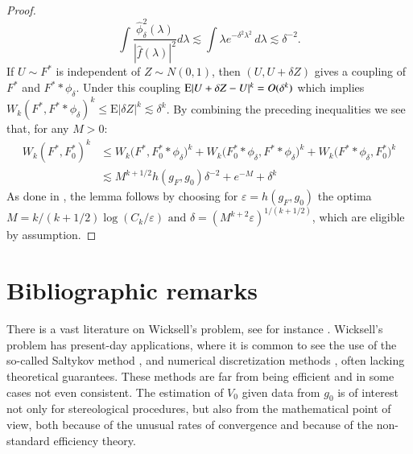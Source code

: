 \begin{proof}
    $$\int \frac{\hat{\phi}_{\delta}^2 (\lambda)} { |\hat{f} (\lambda)|^2}  d \lambda \lesssim \int \lambda e^{- \delta^2 \lambda^2} \, d\lambda \lesssim \delta^{-2}.$$
    If $U \sim F^*$ is independent of $Z \sim N(0,1)$, then $(U, U+\delta Z)$ gives a coupling of $F^*$ and $F^* * \phi_\delta$. Under this coupling $\mathrm{E} |U + \delta Z - U|^k  = O(\delta^k)$ which implies $W_k\left(F^*, F^* * \phi_\delta\right)^k \leq \mathrm{E}|\delta Z|^k \lesssim \delta^k$. By combining the preceding inequalities we see that, for any $M >0$:
    \begin{align*}
        W_k\left(F^*, F^*_0 \right)^k  &\leq W_k\big(F^* , F^*_0 * \phi_\delta\big)^k +  W_k\big( F^*_0 * \phi_\delta, F^* * \phi_\delta\big)^k + W_k\big(F^* * \phi_\delta, F^*_0 \big)^k\\
        &\lesssim M^{k+1 / 2} h\left(g_{\scriptscriptstyle{F}}, g_0\right) \delta^{-2}+e^{-M}+\delta^k
    \end{align*}
    As done in \cite{25}, the lemma follows by choosing for $\varepsilon = h\left(g_{\scriptscriptstyle{F}}, g_0\right)$ the optima $M=k /(k+1/2) \log \left(C_k / \varepsilon\right) \text { and } \delta=\left(M^{k+ 2} \varepsilon\right)^{1 /(k+1/2)}$, which are eligible by assumption.
\end{proof}



 








\section{Bibliographic remarks}

There is a vast literature on Wicksell's problem, see for instance \cite{18, 20, 27, 17, 10,1,  2,16,3,19, 9, 15}. Wicksell's problem has present-day applications, where it is common to see the use of the so-called Saltykov method \cite{49}, and numerical discretization methods \cite{34}, often lacking theoretical guarantees. These methods are far from being efficient and in some cases not even consistent. The estimation of $V_0$ given data from $g_0$ is of interest not only for stereological procedures, but also from the mathematical point of view, both because of the unusual rates of convergence and because of the non-standard efficiency theory.

